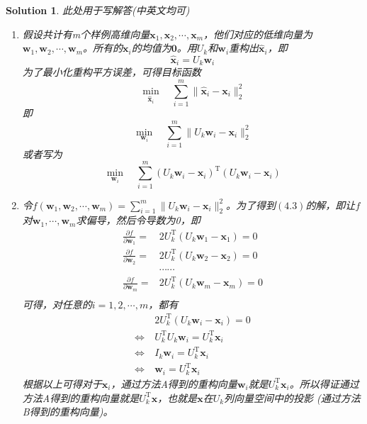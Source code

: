 \documentclass[a4paper,UTF8]{article}
\numberwithin{equation}{section}
\newtheorem*{mySol}{Solution}
\begin{document}
\begin{mySol}
	此处用于写解答(中英文均可)
\begin{enumerate}[(1)]
\item 
假设共计有m个样例高维向量$\mathbf{x}_1,\mathbf{x}_2,\cdots,\mathbf{x}_m$，他们对应的低维向量为$\mathbf{w}_1,\mathbf{w}_2,\cdots,\mathbf{w}_m$。所有的$\mathbf{x}_i$的均值为$\mathbf{0}$。用$U_k$和$\mathbf{w}_i$重构出$\hat{\mathbf{x}}_i$，即
\begin{equation}
\hat{\mathbf{x}}_i = U_k\mathbf{w}_i
\end{equation}
为了最小化重构平方误差，可得目标函数
\begin{equation}
\min_{\hat{\mathbf{x}}_i} \quad \sum_{i=1}^{m}\lVert \hat{\mathbf{x}}_i - \mathbf{x}_i\rVert_2^2	
\end{equation}
即
\begin{equation}
\min_{\mathbf{w}_i} \quad \sum_{i=1}^{m}\lVert U_k\mathbf{w}_i - \mathbf{x}_i\rVert_2^2	
\end{equation}
或者写为
\begin{equation}
\min_{\mathbf{w}_i} \quad \sum_{i=1}^{m}(U_k\mathbf{w}_i - \mathbf{x}_i)^\mathrm{T}(U_k\mathbf{w}_i - \mathbf{x}_i)
\end{equation}
\item 
令$f(\mathbf{w}_1,\mathbf{w}_2,\cdots,\mathbf{w}_m)=\sum_{i=1}^{m}\lVert U_k\mathbf{w}_i - \mathbf{x}_i\rVert_2^2$。为了得到$(4.3)$的解，即让$f$对$\mathbf{w}_1,\cdots,\mathbf{w}_m$求偏导，然后令导数为0，即
\begin{equation}
\begin{aligned}
\frac{\partial f}{\partial \mathbf{w}_1} =& 2U_k^\mathrm{T}(U_k\mathbf{w}_1 - \mathbf{x}_1)=0\\
\frac{\partial f}{\partial \mathbf{w}_2} =& 2U_k^\mathrm{T}(U_k\mathbf{w}_2 - \mathbf{x}_2)=0\\
&\cdots\cdots\\
\frac{\partial f}{\partial \mathbf{w}_m} =& 2U_k^\mathrm{T}(U_k\mathbf{w}_m - \mathbf{x}_m)=0\\
\end{aligned}
\end{equation}
可得，对任意的$i=1,2,\cdots,m$，都有
\begin{equation}
\begin{aligned}
&2U_k^\mathrm{T}(U_k\mathbf{w}_i - \mathbf{x}_i)=0\\
\Leftrightarrow\ &U_k^\mathrm{T}U_k\mathbf{w}_i = U_k^\mathrm{T}\mathbf{x}_i\\
\Leftrightarrow\ &I_k\mathbf{w}_i = U_k^\mathrm{T}\mathbf{x}_i\\
\Leftrightarrow\ &\mathbf{w}_i = U_k^\mathrm{T}\mathbf{x}_i
\end{aligned}
\end{equation}
根据以上可得对于$\mathbf{x}_i$，通过方法A得到的重构向量$\mathbf{w}_i$就是$U_k^\mathrm{T}\mathbf{x}_i$。所以得证通过方法A得到的重构向量就是$U_k^\mathrm{T}\mathbf{x}$，也就是$\mathbf{x}$在$U_k$列向量空间中的投影 (通过方法B得到的重构向量)。
\end{enumerate}
\end{mySol}
\end{document}
